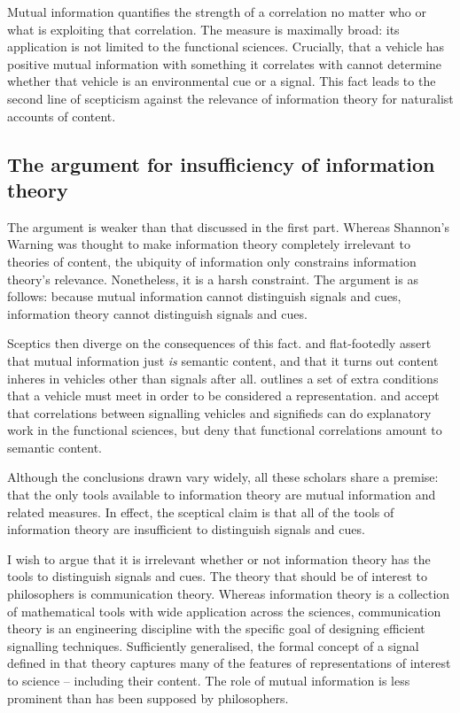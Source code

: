 Mutual information quantifies the strength of a correlation no matter who or what is exploiting that correlation.
The measure is maximally broad: its application is not limited to the functional sciences.
Crucially, that a vehicle has positive mutual information with something it correlates with cannot determine whether that vehicle is an environmental cue or a signal.
This fact leads to the second line of scepticism against the relevance of information theory for naturalist accounts of content.

\subsection{The argument for insufficiency of information theory}

The argument is weaker than that discussed in the first part.
Whereas Shannon's Warning was thought to make information theory completely irrelevant to theories of content, the ubiquity of information only constrains information theory's relevance.
Nonetheless, it is a harsh constraint.
The argument is as follows: because mutual information cannot distinguish signals and cues, information theory cannot distinguish signals and cues.

Sceptics then diverge on the consequences of this fact.
\citet{skyrms2010signals} and \citet{isaac2018semantics} flat-footedly assert that mutual information just \textit{is} semantic content, and that it turns out content inheres in vehicles other than signals after all.
\citet[SECTION]{shea2018representation} outlines a set of extra conditions that a vehicle must meet in order to be considered a representation. 
\citet{lean2014shannon} and \citet[CHAPTER]{hutto2017evolving} accept that correlations between signalling vehicles and signifieds can do explanatory work in the functional sciences, but deny that functional correlations amount to semantic content.

Although the conclusions drawn vary widely, all these scholars share a premise: that the only tools available to information theory are mutual information and related measures.
In effect, the sceptical claim is that all of the tools of information theory are insufficient to distinguish signals and cues.

I wish to argue that it is irrelevant whether or not information theory has the tools to distinguish signals and cues.
The theory that should be of interest to philosophers is communication theory.
Whereas information theory is a collection of mathematical tools with wide application across the sciences, communication theory is an engineering discipline with the specific goal of designing efficient signalling techniques.
Sufficiently generalised, the formal concept of a signal defined in that theory captures many of the features of representations of interest to science -- including their content.
The role of mutual information is less prominent than has been supposed by philosophers.

